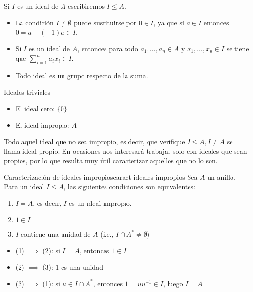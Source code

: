 Si $I$ es un ideal de $A$ escribiremos $I \leq A$.

\begin{remark}
    \begin{itemize}
        \item La condición \(I \neq \emptyset\) puede sustituirse por \(0 \in I\), ya que si \(a \in I\) entonces \(0 = a + (-1)a \in I\).
        \item Si \(I\) es un ideal de \(A\), entonces para todo \(a_1, \ldots, a_n \in A\) y \(x_1, \ldots, x_n \in I\) se tiene que \(\sum_{i=1}^n a_i x_i \in I\).
        \item Todo ideal es un grupo respecto de la suma.
    \end{itemize}
\end{remark}

\begin{example}{Ideales triviales}{}
    \begin{itemize}
        \item El {ideal cero}: \(\{0\}\)
        \item El {ideal impropio}: \(A\)
    \end{itemize}
\end{example}

Todo aquel ideal que no sea impropio, es decir, que verifique $I \leq A, I \neq A$ se llama ideal propio. En ocasiones nos interesará trabajar solo con ideales que sean propios, por lo que resulta muy útil caracterizar aquellos que no lo son.

\begin{lemma}{Caracterización de ideales impropios}{caract-ideales-impropios}
    Sea \(A\) un anillo. Para un ideal \(I \leq A\), las siguientes condiciones son equivalentes:
    \begin{enumerate}
        \item \(I = A\), es decir, $I$ es un ideal impropio.
        \item \(1 \in I\)
        \item \(I\) contiene una unidad de \(A\) (i.e., \(I \cap A^* \neq \emptyset\))
    \end{enumerate}
\end{lemma}

\begin{proofbox}
    \begin{itemize}
        \item (1) \(\implies\) (2): si \(I = A\), entonces \(1 \in I\)
        \item (2) \(\implies\) (3): \(1\) es una unidad
        \item (3) \(\implies\) (1): si \(u \in I \cap A^*\), entonces \(1 = uu^{-1} \in I\), luego \(I = A\)
    \end{itemize}
\end{proofbox}

